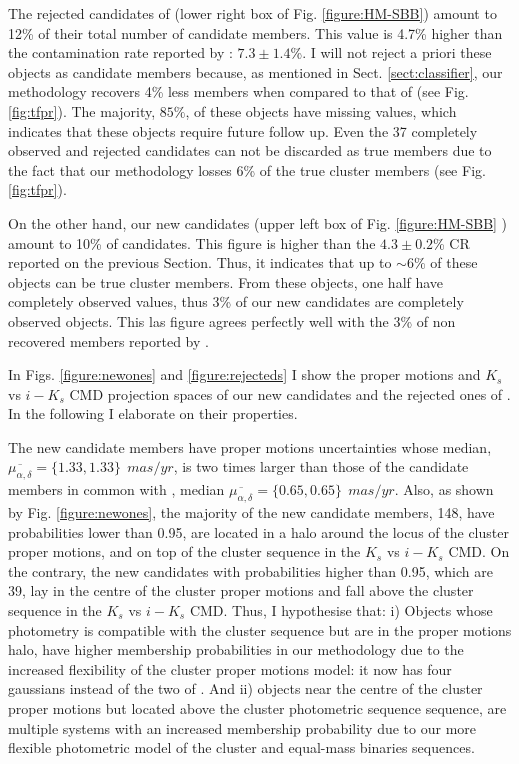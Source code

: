 The rejected candidates of \citet{Bouy2015} (lower right box of Fig. \ref{figure:HM-SBB}) amount to 12\% of their total number of candidate members. This value is 4.7\% higher than the contamination rate reported by \citet{Sarro2014}: $7.3\pm1.4$\%. I will not reject a priori these objects as candidate members because, as mentioned in Sect. \ref{sect:classifier}, our methodology recovers 4\% less members when compared to that of \citet{Sarro2014}(see Fig. \ref{fig:tfpr}). The majority, $85\%$, of these objects have missing values, which indicates that these objects require future follow up. Even the 37 completely observed and rejected candidates can not be discarded as true members due to the fact that our methodology losses 6\% of the true cluster members (see Fig. \ref{fig:tfpr}).  

On the other hand, our new candidates (upper left box of Fig. \ref{figure:HM-SBB} ) amount to 10\% of \citet{Bouy2015} candidates. This figure is higher than the $4.3\pm0.2$\% CR reported on the previous Section. Thus, it indicates that up to $\sim6\%$ of these objects can be true cluster members. From these objects, one half have completely observed values, thus 3\% of our new candidates are completely observed objects. This las figure agrees perfectly well with the 3\% of non recovered members reported by \citet{Sarro2014}. 

In Figs. \ref{figure:newones} and \ref{figure:rejecteds} I show the proper motions and $K_s$ vs $i-K_s$ CMD projection spaces of our new candidates and the rejected ones  of \citet{Bouy2015}. In the following I elaborate on their properties.

The new candidate members have proper motions uncertainties whose median, $\overline{\mu_{\alpha,\delta}}=\{1.33,1.33\} \ \ mas/yr$, is two times larger than those of the candidate members in common with \citet{Bouy2015}, median $\overline{\mu_{\alpha,\delta}}=\{0.65,0.65\} \ \ mas/yr$. Also, as shown by Fig. \ref{figure:newones}, the majority of the new candidate members, 148, have probabilities lower than 0.95, are located in a halo around the locus of the cluster proper motions, and on top of the cluster sequence in the $K_s$ vs $i-K_s$ CMD. On the contrary, the new candidates with probabilities higher than 0.95, which are 39, lay in the centre of the cluster proper motions and fall above the cluster sequence in the $K_s$ vs $i-K_s$ CMD. Thus, I hypothesise that: i) Objects whose photometry is compatible with the cluster sequence but are in the proper motions halo, have higher membership probabilities in our methodology due to the increased flexibility of the cluster proper motions model: it now has four gaussians instead of the two of \citet{Bouy2015}. And ii) objects near the centre of the cluster proper motions but located above the cluster photometric sequence sequence, are multiple systems \cite[probably triple systems which can amount to 4\% of the population][]{Duquennoy1991} with an increased membership probability due to our more flexible photometric model of the cluster and equal-mass binaries sequences.

